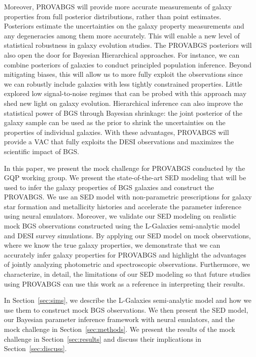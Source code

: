 Moreover, PROVABGS will provide more accurate measurements of galaxy properties
from full posterior distributions, rather than point estimates. 
Posteriors estimate the uncertainties on the galaxy property measurements and
any degeneracies among them more accurately. 
This will enable a new level of statistical robustness in galaxy evolution
studies.
The PROVABGS posteriors will also open the door for Bayesian Hierarchical
approaches.
For instance, we can combine posteriors of galaxies to conduct principled
population inference. 
Beyond mitigating biases, this will allow us to more fully exploit the 
observations since we can robustly include galaxies with less tightly
constrained properties.  
Little explored low signal-to-noise regimes that can be probed with this
approach may shed new light on galaxy evolution.
Hierarchical inference can also improve the statistical power of BGS through
Bayesian shrinkage: the joint posterior of the galaxy sample can be used as the
prior to shrink the uncertainties on the properties of individual galaxies. 
With these advantages, PROVABGS will provide a VAC that fully exploits the
DESI observations and maximizes the scientific impact of BGS. 

In this paper, we present the mock challenge for PROVABGS conducted by the GQP
working group. 
We present the state-of-the-art SED modeling that will be used to infer the
galaxy properties of BGS galaxies and construct the PROVABGS. 
We use an SED model with non-parametric prescriptions for galaxy star formation
and metallicity histories and accelerate the parameter inference using neural
emulators. 
Moreover, we validate our SED modeling on realistic mock BGS observations
constructed using the {\sc L-Galaxies} semi-analytic
model~\citep{henriques2015} and DESI survey simulations. 
By applying our SED model on mock observations, where we know the true galaxy
properties, we demonstrate that we can accurately infer galaxy properties for
PROVABGS and highlight the advantages of jointly analyzing photometric and
spectroscopic observations. 
Furthermore, we characterize, in detail, the limitations of our SED modeling so
that future studies using PROVABGS can use this work as a reference in
interpreting their results. 

In Section~\ref{sec:sims}, we describe the {\sc L-Galaxies} semi-analytic
model and how we use them to construct mock BGS observations. 
We then present the SED model, our Bayesian parameter inference framework with
neural emulators, and the mock challenge in Section~\ref{sec:methods}. 
We present the results of the mock challenge in Section~\ref{sec:results} and
discuss their implications in Section~\ref{sec:discuss}. 
